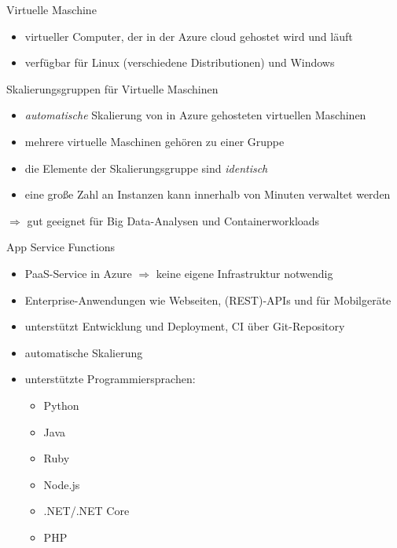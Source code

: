 
\begin{flashcard}[Definition]{Virtuelle Maschine}
    \begin{itemize}
        \item virtueller Computer, der in der Azure cloud gehostet wird und läuft
        \item verfügbar für Linux (verschiedene Distributionen) und Windows
    \end{itemize}
\end{flashcard}

\begin{flashcard}[Definition]{Skalierungsgruppen für Virtuelle Maschinen}
    \begin{itemize}
        \item \emph{automatische} Skalierung von in Azure gehosteten virtuellen Maschinen
        \item mehrere virtuelle Maschinen gehören zu einer Gruppe
        \item die Elemente der Skalierungsgruppe sind \emph{identisch}
        \item eine große Zahl an Instanzen kann innerhalb von Minuten verwaltet werden
    \end{itemize}
    $\Rightarrow$ gut geeignet für Big Data-Analysen und Containerworkloads

\end{flashcard}

\begin{flashcard}[Definition]{App Service Functions}
    \begin{itemize}
        \item PaaS-Service in Azure\newline
        $\Rightarrow$ keine eigene Infrastruktur notwendig
        \item Enterprise-Anwendungen wie Webseiten, (REST)-APIs und für Mobilgeräte
        \item unterstützt Entwicklung und Deployment, CI über Git-Repository
        \item automatische Skalierung
        \item unterstützte Programmiersprachen:
        \begin{itemize}
            \item Python
            \item Java
            \item Ruby
            \item Node.js
            \item .NET/.NET Core
            \item PHP
        \end{itemize}
    \end{itemize}
\end{flashcard}

